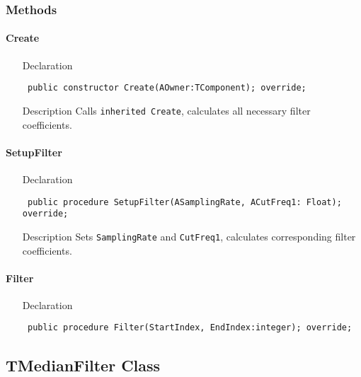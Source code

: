 \documentclass[12pt,a4paper,oneside]{report}
\newcommand{\declarationitem}[1]{{\addfontfeatures{FakeBold=1.3} #1}}
\newcommand{\descriptiontitle}[1]{{\addfontfeatures{FakeSlant}#1}}
\newcommand{\code}[1]{\texttt{#1}}
\begin{document}
\subsubsection{Methods}
\paragraph{Create}\hspace*{\fill}
\label{lmfilters.TGaussFilter-Create}
\begin{itemize}\item[\declarationitem{Declaration}\hfill]
	\begin{flushleft}
		\code{
			public constructor Create(AOwner:TComponent); override;}
	\end{flushleft}
\item[\descriptiontitle{Description}] Calls \code{inherited Create}, calculates all necessary filter coefficients.
\end{itemize}
\paragraph{SetupFilter}\hspace*{\fill}
\label{lmfilters.TGaussFilter-SetupFilter}
\begin{itemize}\item[\declarationitem{Declaration}\hfill]
	\begin{flushleft}
		\code{
			public procedure SetupFilter(ASamplingRate, ACutFreq1: Float); override;}
	\end{flushleft}
\item[\descriptiontitle{Description}] Sets \code{SamplingRate} and \code{CutFreq1}, calculates corresponding filter coefficients. 
\end{itemize}
\paragraph{Filter}\hspace*{\fill}
\label{lmfilters.TGaussFilter-Filter}
\begin{itemize}\item[\declarationitem{Declaration}\hfill]
	\begin{flushleft}
		\code{
			public procedure Filter(StartIndex, EndIndex:integer); override;}
	\end{flushleft}
\end{itemize}
\subsection{TMedianFilter Class}
\label{lmfilters.TMedianFilter}
\end{document}
